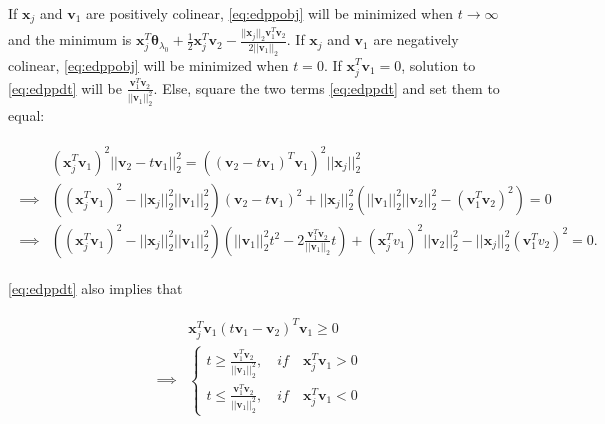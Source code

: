 If $\boldsymbol x_j$ and $\boldsymbol v_1$ are positively colinear, \eqref{eq:edppobj} will be minimized when $t\xrightarrow[]{}\infty$ and the minimum is $\boldsymbol x_j^T\boldsymbol\theta_{\lambda_0}+\frac{1}{2}\boldsymbol x_j^T \boldsymbol v_2-\frac{||\boldsymbol x_j||_2 \boldsymbol v_1^T \boldsymbol v_2}{2||\boldsymbol v_1||_2 }$. If $\boldsymbol x_j$ and $\boldsymbol v_1$ are negatively colinear, \eqref{eq:edppobj} will be minimized when $t=0$. If $\boldsymbol x_j^T \boldsymbol v_1=0$, solution to \eqref{eq:edppdt} will be $\frac{\boldsymbol v_1^T \boldsymbol v_2}{||\boldsymbol v_1||_2^2}$. Else, square the two terms \eqref{eq:edppdt} and set them to equal:

\begin{gather}
    \begin{aligned}
        \label{eq:edppquad}
        &(\boldsymbol x_j^T \boldsymbol v_1)^2||\boldsymbol v_2-t\boldsymbol v_1||_2^2=\left((\boldsymbol v_2-t\boldsymbol v_1)^T \boldsymbol v_1\right)^2||\boldsymbol x_j||_2^2\\
        \implies&\left((\boldsymbol x_j^T\boldsymbol v_1)^2-||\boldsymbol x_j||_2^2||\boldsymbol v_1||_2^2\right)(\boldsymbol v_2-t\boldsymbol v_1)^2+||\boldsymbol x_j||_2^2\left(||\boldsymbol v_1||_2^2||\boldsymbol v_2||_2^2-(\boldsymbol v_1^T\boldsymbol v_2)^2\right)=0\\
        \implies&\left((\boldsymbol x_j^T\boldsymbol v_1)^2-||\boldsymbol x_j||_2^2||\boldsymbol v_1||_2^2\right)\left(||\boldsymbol v_1||_2^2t^2-2\frac{\boldsymbol v_1^T \boldsymbol v_2}{||\boldsymbol v_1||_2}t\right)+(\boldsymbol x_j^T v_1)^2||\boldsymbol v_2||_2^2-||\boldsymbol x_j||_2^2(\boldsymbol v_1^Tv_2)^2=0.
    \end{aligned}
\end{gather}

\eqref{eq:edppdt} also implies that

\begin{gather}
    \begin{aligned}
        &\boldsymbol x_j^T\boldsymbol v_1(t\boldsymbol v_1-\boldsymbol v_2)^T\boldsymbol v_1\geq 0\\
        \implies&\begin{cases}
        t\geq\frac{\boldsymbol v_1^T\boldsymbol v_2}{||\boldsymbol v_1||_2^2},\quad \textit{if}\quad\boldsymbol x_j^T\boldsymbol v_1>0\\
        t\leq\frac{\boldsymbol v_1^T\boldsymbol v_2}{||\boldsymbol v_1||_2^2},\quad \textit{if}\quad\boldsymbol x_j^T\boldsymbol v_1<0
        \end{cases}
    \end{aligned}
\end{gather}

